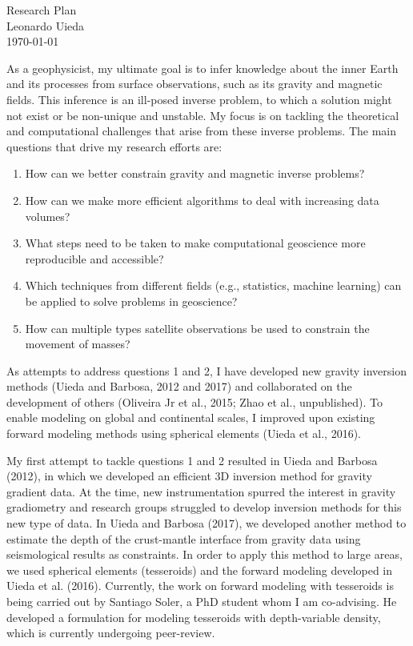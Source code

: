 \documentclass[12pt,notitlepage]{article}
\begin{document}
\begin{center}
    {\huge Research Plan}
    \\[0.2in]
    {Leonardo Uieda}
    \\[0.1in]
    {\small \today}
\end{center}


As a geophysicist, my ultimate goal is to infer knowledge about the inner Earth and its
processes from surface observations, such as its gravity and magnetic fields.
This inference is an ill-posed inverse problem, to which a solution might not exist or
be non-unique and unstable.
My focus is on tackling the theoretical and computational challenges that arise from
these inverse problems.
The main questions that drive my research efforts are:

\begin{enumerate}
    \item How can we better constrain gravity and magnetic inverse problems?
    \item How can we make more efficient algorithms to deal with increasing data volumes?
    \item What steps need to be taken to make computational geoscience more reproducible
        and accessible?
    \item Which techniques from different fields (e.g., statistics, machine learning)
        can be applied to solve problems in geoscience?
    \item How can multiple types satellite observations be used to constrain the
        movement of masses?
\end{enumerate}

As attempts to address questions 1 and 2, I have developed new gravity inversion methods
(Uieda and Barbosa, 2012 and 2017) and collaborated on the development of others
(Oliveira Jr et al., 2015; Zhao et al., unpublished).
To enable modeling on global and continental scales, I improved upon existing forward
modeling methods using spherical elements (Uieda et al., 2016).

My first attempt to tackle questions 1 and 2 resulted in Uieda and Barbosa (2012), in
which we developed an efficient 3D inversion method for gravity gradient data.
At the time, new instrumentation spurred the interest in gravity gradiometry and
research groups struggled to develop inversion methods for this new type of data.
In Uieda and Barbosa (2017), we developed another method to estimate the depth of the
crust-mantle interface from gravity data using seismological results as constraints.
In order to apply this method to large areas, we used spherical elements (tesseroids)
and the forward modeling developed in Uieda et al. (2016).
Currently, the work on forward modeling with tesseroids is being carried out by
Santiago Soler, a PhD student whom I am co-advising.
He developed a formulation for modeling tesseroids with depth-variable density, which
is currently undergoing peer-review.
\end{document}
